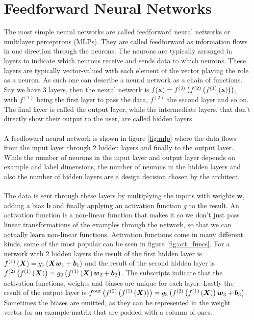 \section{Feedforward Neural Networks} \label{sec:feedforward_nn}
The most simple neural networks are called feedforward neural networks or multilayer perceptrons (MLPs). They are called feedforward as information flows in one direction through the neurons. The neurons are typically arranged in layers to indicate which neurons receive and sends data to which neurons. These layers are typically vector-valued with each element of the vector playing the role as a neuron. As such one can describe a neural network as a chain of functions. Say we have 3 layers, then the neural network is $f(\mathbf{x}) = f^{(3)}\left (f^{(2)}\left (f^{(1)}\left (\mathbf{x}\right)\right)\right)$, with $f^{(1)}$ being the first layer to pass the data, $f^{(2)}$ the second layer and so on. The final layer is called the output layer, while the intermediate layers, that don't directly show their output to the user, are called hidden layers. \\
\\
A feedfoward neural network is shown in figure \ref{fig:mlp} where the data flows from the input layer through 2 hidden layers and finally to the output layer. While the number of neurons in the input layer and output layer depends on example and label dimensions, the number of neurons in the hidden layers and also the number of hidden layers are a design decision chosen by the architect. \\
\\
The data is sent through these layers by multiplying the inputs with weights $\boldsymbol{w}$, adding a bias $\boldsymbol{b}$ and finally applying an activation function $g$ to the result. An activation function is a non-linear function that makes it so we don't just pass linear transformations of the examples through the network, so that we can actually learn non-linear functions. Activation functions come in many different kinds, some of the most popular can be seen in figure \ref{fig:act_funcs}. For a network with 2 hidden layers the result of the first hidden layer is $f^{(1)}\left (\boldsymbol{X}\right) = g_1 \left (\boldsymbol{X} \boldsymbol{w}_1 + \boldsymbol{b}_1\right)$ and the result of the second hidden layer is $f^{(2)} \left (f^{(1)}\left (\boldsymbol{X}\right)\right) = g_2 \left (f^{(1)}\left (\boldsymbol{X}\right) \boldsymbol{w}_2 + \boldsymbol{b}_2\right)$. The subscripts indicate that the activation functions, weights and biases are unique for each layer. Lastly the result of the output layer is $f^{\text{out}} \left (f^{(2)} \left (f^{(1)}\left (\boldsymbol{X}\right)\right)\right) = g_3 \left (f^{(2)} \left (f^{(1)}\left (\boldsymbol{X}\right)\right) \boldsymbol{w}_3 + \boldsymbol{b}_3\right)$. Sometimes the biases are omitted, as they can be represented in the weight vector for an example-matrix that are padded with a column of ones. \\
